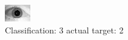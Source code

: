 \begin{figure}[h!]
\begin{center}
\includegraphics[width=0.60\columnwidth]{figures/ID1674_class_3_target_2.png}
\end{center}
\caption{ Classification: 3 actual target: 2}
\label{fig:ID1674_class_3_target_2}
\end{figure}
